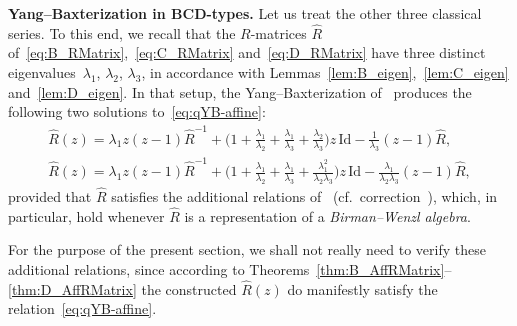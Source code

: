 \documentclass[pdftex]{sigma}
\numberwithin{equation}{section}
\newcommand{\Id}{\mathrm{Id}}
\begin{document}
\textbf{Yang--Baxterization in $\boldsymbol{BCD}$-types.}
Let us treat the other three classical series. To this end, we recall that the $R$-matrices $\hat{R}$ of~\eqref{eq:B_RMatrix},~\eqref{eq:C_RMatrix} and~\eqref{eq:D_RMatrix} have three distinct eigenvalues~$\lambda_1$, $\lambda_2$, $\lambda_3$, in accordance with Lemmas~\ref{lem:B_eigen},~\ref{lem:C_eigen} and~\ref{lem:D_eigen}. In that setup, the Yang--Baxterization of~\cite[equations~(3.29) and~(3.31)]{GWX} produces the following two solutions to~\eqref{eq:qYB-affine}:
\begin{gather}\label{eq:affinization_a}
 \hat{R}(z) =
 \lambda_{1}z(z - 1)\hat{R}^{-1} +
 \biggl(1 + \frac{\lambda_{1}}{\lambda_{2}} + \frac{\lambda_{1}}{\lambda_{3}} + \frac{\lambda_{2}}{\lambda_{3}}\biggr) z \,\Id
 - \frac{1}{\lambda_{3}}(z - 1)\hat{R},
\\ \label{eq:affinization_b}
 \hat{R}(z) = \lambda_{1}z(z - 1)\hat{R}^{-1} + \biggl(1 + \frac{\lambda_{1}}{\lambda_{2}} + \frac{\lambda_{1}}{\lambda_{3}} + \frac{\lambda_{1}^{2}}{\lambda_{2}\lambda_{3}}\biggr)z\,\Id - \frac{\lambda_{1}}{\lambda_{2}\lambda_{3}}(z - 1)\hat{R},
\end{gather}
provided that $\hat{R}$ satisfies the additional relations of~\cite[equation~(3.27)]{GWX} (cf.\ correction~\cite[equation~(A.9)]{GWX}), which, in particular, hold whenever $\hat{R}$ is a representation of a \emph{Birman--Wenzl algebra}.

\begin{Remark}
For the purpose of the present section, we shall not really need to verify these additional relations, since according to Theorems~\ref{thm:B_AffRMatrix}--\ref{thm:D_AffRMatrix} the constructed $\hat{R}(z)$ do manifestly satisfy the relation~\eqref{eq:qYB-affine}.
\end{Remark}
\end{document}
